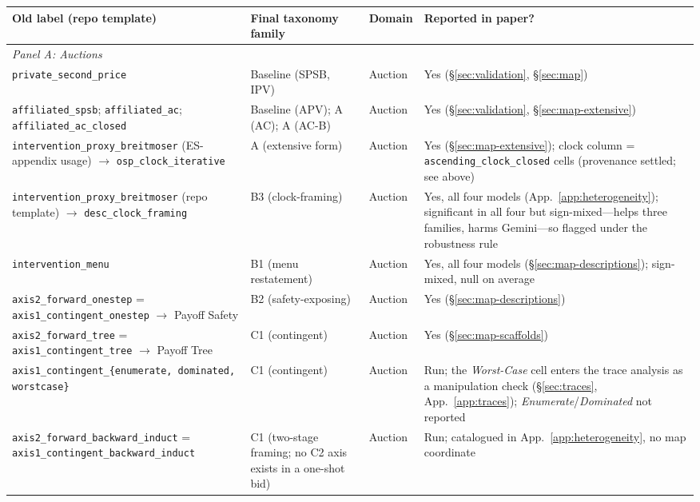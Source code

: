 \begin{table}[p]
\centering
\footnotesize
\setlength{\tabcolsep}{4pt}
\begin{tabular}{p{4.9cm} p{3.3cm} p{1.0cm} p{4.4cm}}
\toprule
\textbf{Old label (repo template)} & \textbf{Final taxonomy family} & \textbf{Domain} & \textbf{Reported in paper?} \\
\midrule
\multicolumn{4}{l}{\emph{Panel A: Auctions}} \\
\midrule
\texttt{private\_second\_price} & Baseline (SPSB, IPV) & Auction & Yes (\S\ref{sec:validation}, \S\ref{sec:map}) \\
\texttt{affiliated\_spsb}; \texttt{affiliated\_ac}; \texttt{affiliated\_ac\_closed} & Baseline (APV); A (AC); A (AC-B) & Auction & Yes (\S\ref{sec:validation}, \S\ref{sec:map-extensive}) \\
\texttt{intervention\_proxy\_breitmoser} (ES-appendix usage) $\to$ \texttt{osp\_clock\_iterative} & A (extensive form) & Auction & Yes (\S\ref{sec:map-extensive}); clock column = \texttt{ascending\_clock\_closed} cells (provenance settled; see above) \\
\texttt{intervention\_proxy\_breitmoser} (repo template) $\to$ \texttt{desc\_clock\_framing} & B3 (clock-framing) & Auction & Yes, all four models (App.~\ref{app:heterogeneity}); significant in all four but sign-mixed---helps three families, harms Gemini---so flagged under the robustness rule \\
\texttt{intervention\_menu} & B1 (menu restatement) & Auction & Yes, all four models (\S\ref{sec:map-descriptions}); sign-mixed, null on average \\
\texttt{axis2\_forward\_onestep} = \texttt{axis1\_contingent\_onestep} $\to$ Payoff Safety & B2 (safety-exposing) & Auction & Yes (\S\ref{sec:map-descriptions}) \\
\texttt{axis2\_forward\_tree} = \texttt{axis1\_contingent\_tree} $\to$ Payoff Tree & C1 (contingent) & Auction & Yes (\S\ref{sec:map-scaffolds}) \\
\texttt{axis1\_contingent\_\{enumerate, dominated, worstcase\}} & C1 (contingent) & Auction & Run; the \emph{Worst-Case} cell enters the trace analysis as a manipulation check (\S\ref{sec:traces}, App.~\ref{app:traces}); \emph{Enumerate}/\emph{Dominated} not reported \\
\texttt{axis2\_forward\_backward\_induct} = \texttt{axis1\_contingent\_backward\_induct} & C1 (two-stage framing; no C2 axis exists in a one-shot bid) & Auction & Run; catalogued in App.~\ref{app:heterogeneity}, no map coordinate \\

\end{tabular}
\end{table}
